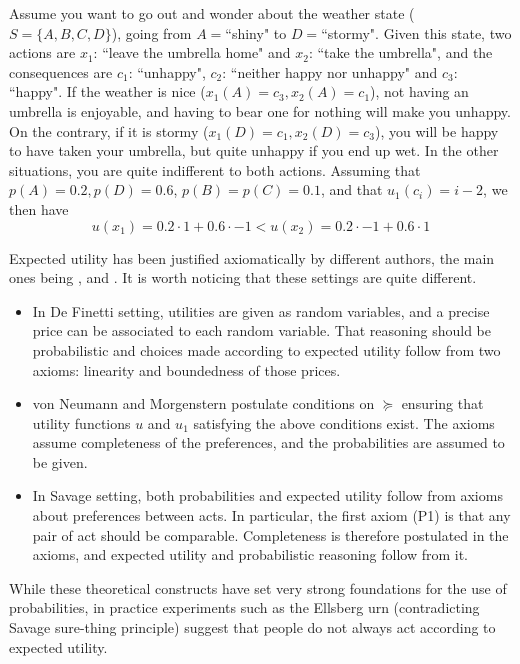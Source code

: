 \documentclass[french, english]{llncs}
\begin{document}
	
	\begin{example}\label{exm:DMU}
		Assume you want to go out and wonder about the weather state ($S=\{A,B,C,D\}$), going from $A=$``shiny" to $D=$``stormy". Given this state, two actions are $x_1$: ``leave the umbrella home" and $x_2$: ``take the umbrella", and the consequences are $c_1$: ``unhappy", $c_2$: ``neither happy nor unhappy" and $c_3$: ``happy". If the weather is nice ($x_1(A)=c_3,x_2(A)=c_1$), not having an umbrella is enjoyable,  and having to bear one for nothing will make you unhappy. On the contrary, if it is stormy ($x_1(D)=c_1,x_2(D)=c_3$), you will be happy to have taken your umbrella, but quite unhappy if you end up wet. In the other situations, you are quite indifferent to both actions. Assuming that $p(A)=0.2, p(D)=0.6$, $p(B)=p(C)=0.1$, and that $u_1(c_i)=i-2$, we then have
		$$u(x_1)=0.2 \cdot 1 + 0.6 \cdot -1 <  u(x_2)=0.2 \cdot -1 + 0.6 \cdot 1$$
	\end{example}
	
	Expected utility has been justified axiomatically by different authors, the main ones being \citet{savage_foundations_1972}, \citet{definetti_probability_2017} and \citet{von_neumann_theory_2004}. It is worth noticing that these settings are quite different.
	\begin{itemize}
		\item In De Finetti setting, utilities are given as random variables, and a precise price can be associated to each random variable. That reasoning should be probabilistic and choices made according to expected utility follow from two axioms: linearity and boundedness of those prices.
		\item von Neumann and Morgenstern postulate conditions on $\succeq$ ensuring that utility functions $u$ and $u_1$ satisfying the above conditions exist. The axioms assume completeness of the preferences, and the probabilities are assumed to be given.
		\item In Savage setting, both probabilities and expected utility follow from axioms about preferences between acts. In particular, the first axiom (P1) is that any pair of act should be comparable. Completeness is therefore postulated in the axioms, and expected utility and probabilistic reasoning follow from it. 
	\end{itemize}
	While these theoretical constructs have set very strong foundations for the use of probabilities, in practice experiments such as the Ellsberg urn (contradicting Savage sure-thing principle) suggest that people do not always act according to expected utility. 
	
\end{document}
